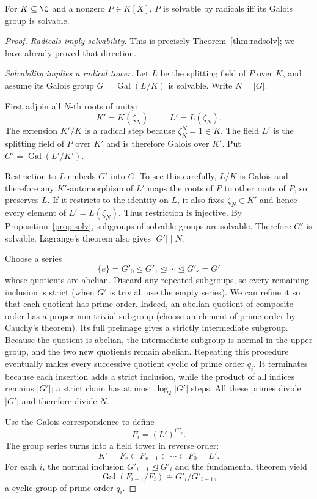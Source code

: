 \begin{theorem}\label{thm:galoiscrit}
For $K\subseteq\C$ and a nonzero $P\in K[X]$, $P$ is solvable by radicals iff its Galois group is solvable.
\end{theorem}
\begin{proof}
\emph{Radicals imply solvability.}
This is precisely Theorem~\ref{thm:radsolv};
we have already proved that direction.

\emph{Solvability implies a radical tower.}
Let $L$ be the splitting field of $P$ over
$K$, and assume its Galois group
$G=\operatorname{Gal}(L/K)$ is solvable.
Write $N=|G|$.

First adjoin all $N$-th roots of unity:
\[
K'=K(\zeta_N),\qquad
L'=L(\zeta_N).
\]
The extension $K'/K$ is a radical step
because $\zeta_N^N=1\in K$.
The field $L'$ is the splitting field of
$P$ over $K'$ and is therefore Galois
over $K'$. Put
$G'=\operatorname{Gal}(L'/K')$.

Restriction to $L$ embeds $G'$ into
$G$. To see this carefully, $L/K$ is
Galois and therefore any $K'$-automorphism
of $L'$ maps the roots of $P$ to other
roots of $P$, so preserves $L$.
If it restricts to the identity on $L$,
it also fixes $\zeta_N\in K'$ and hence
every element of $L'=L(\zeta_N)$.
Thus restriction is injective.
By Proposition~\ref{prop:solv},
subgroups of solvable groups are solvable.
Therefore $G'$ is solvable. Lagrange's
theorem also gives $|G'|\mid N$.

Choose a series
\[
\{e\}=G'_0\trianglelefteq G'_1
\trianglelefteq\cdots
\trianglelefteq G'_r=G'
\]
whose quotients are abelian. Discard any repeated subgroups, so every
remaining inclusion is strict (when $G'$ is trivial, use the empty series).
We can refine it so that each quotient
has prime order. Indeed, an abelian
quotient of composite order has a
proper non-trivial subgroup (choose
an element of prime order by Cauchy's
theorem). Its full preimage gives a
strictly intermediate subgroup.
Because the quotient is abelian,
the intermediate subgroup is normal
in the upper group, and the two new
quotients remain abelian. Repeating
this procedure eventually
makes every successive quotient
cyclic of prime order $q_i$. It terminates because each insertion adds
a strict inclusion, while the product of all indices remains $|G'|$;
a strict chain has at most $\log_2|G'|$ steps.
All these primes divide $|G'|$
and therefore divide $N$.

Use the Galois correspondence to define
\[
F_i=(L')^{G'_i}.
\]
The group series turns into a field tower
in reverse order:
\[
K'=F_r\subset F_{r-1}\subset\cdots
\subset F_0=L'.
\]
For each $i$, the normal inclusion
$G'_{i-1}\trianglelefteq G'_i$
and the fundamental theorem yield
\[
\operatorname{Gal}(F_{i-1}/F_i)
\cong G'_i/G'_{i-1},
\]
a cyclic group of prime order $q_i$.


\end{proof}
